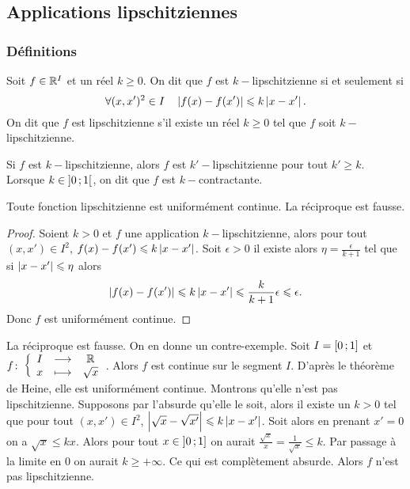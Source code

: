 \subsection{Applications lipschitziennes}

\subsubsection{Définitions}

\begin{defdef}
  Soit \(f \in \mathbb{R}^I\) et un réel \(k \geqslant 0\). On dit que \(f\) est 
  \(k-\)lipschitzienne si et seulement si
  \begin{equation}
    \forall (x,x')^2 \in I \quad \left\lvert f(x)-f(x')\right\rvert \leqslant k \left\lvert x-x'\right\rvert.
  \end{equation}
  On dit que \(f\) est lipschitzienne s'il existe un réel \(k \geqslant 0\) tel 
  que \(f\) soit \(k-\)lipschitzienne.
\end{defdef}
Si \(f\) est \(k-\)lipschitzienne, alors \(f\) est \(k'-\)lipschitzienne pour 
tout \(k' \geqslant k\). Lorsque \(k \in \left] 0 \, ;  1 \right[\), on dit que \(f\) 
est \(k-\)contractante.
%
\begin{theo}
  Toute fonction lipschitzienne est uniformément continue. La réciproque est 
  fausse.
\end{theo}
\begin{proof}
  Soient \(k >0\) et \(f\) une application \(k-\)lipschitzienne, alors pour tout 
  \((x,x') \in I^2\), \(f(x)-f(x') \leqslant k\left\lvert x-x'\right\rvert\). Soit \(\epsilon >0\) 
  il existe alors \(\eta = \frac{\epsilon}{k+1}\) tel que si \(\left\lvert x-x'\right\rvert 
  \leqslant \eta\) alors \begin{equation}
    \left\lvert f(x)-f(x')\right\rvert \leqslant k\left\lvert x-x'\right\rvert \leqslant \frac{k}{k+1} \epsilon 
    \leqslant \epsilon.
  \end{equation}
  Donc \(f\) est uniformément continue.
\end{proof}
La réciproque est fausse. On en donne un contre-exemple. Soit 
\(I=\left[ 0 \, ;  1 \right]\) et \(f\colon \left\{\begin{array}{ccc} I & \longrightarrow &\mathbb{R}\\ x & \longmapsto & \sqrt{x} \end{array} \right.\). Alors \(f\) 
est continue sur le segment \(I\). D'après le théorème de Heine, elle est 
uniformément continue. Montrons qu'elle n'est pas lipschitzienne. Supposons par 
l'absurde qu'elle le soit, alors il existe un \(k >0\) tel que pour tout 
\((x,x') \in I^2\), \(\left\lvert\sqrt{x}-\sqrt{x'}\right\rvert \leqslant k\left\lvert x-x'\right\rvert\). Soit 
alors en prenant \(x'=0\) on a \(\sqrt{x} \leqslant k x\). Alors pour tout \(x 
\in \left] 0 \, ;  1 \right]\) on aurait \(\frac{\sqrt{x}}{x}=\frac{1}{\sqrt{x}} 
\leqslant k\). Par passage à la limite en \(0\) on aurait \(k \geqslant + 
\infty\). Ce qui est complètement absurde. Alors \(f\) n'est pas lipschitzienne.

